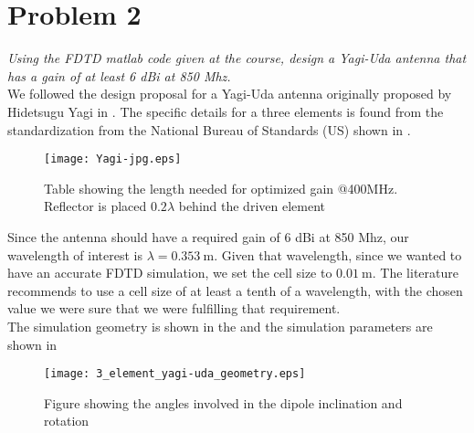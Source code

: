 \section{Problem 2}
\textit{Using the FDTD matlab code given at the course, design a Yagi-Uda antenna that has a gain of at least 6 dBi at 850 Mhz.}\\

We followed the design proposal for a Yagi-Uda antenna originally proposed by Hidetsugu Yagi in \cite{lit:YAGI}. The specific details for a three elements is found from the standardization from the National Bureau of Standards (US) shown in .

\begin{figure}[!h]
  \centering
  \texttt{[image: Yagi-jpg.eps]}
  \caption{Table showing the length needed for optimized gain @400MHz. Reflector is placed $0.2\lambda$ behind the driven element \cite[p.~7]{lit:NBS}}
  \label{tab:Yagi-jpg}
\end{figure}

Since the antenna should have a required gain of 6 dBi at 850 Mhz, our wavelength of interest is $\lambda = \SI{0.353}{\meter}$. Given that wavelength, since we wanted to have an accurate FDTD simulation, we set the cell size to $\SI{0.01}{\meter}$. The literature recommends to use a cell size of at least a tenth of a wavelength, with the chosen value we were sure that we were fulfilling that requirement.\\

The simulation geometry is shown in the  and the simulation parameters are shown in 

\begin{figure}[!h]
  \centering
  \texttt{[image: 3\_element\_yagi-uda\_geometry.eps]}
  \caption{Figure showing the angles involved in the dipole inclination and rotation}
  \label{fig:3_element_yagi-uda_geometry}
\end{figure}


